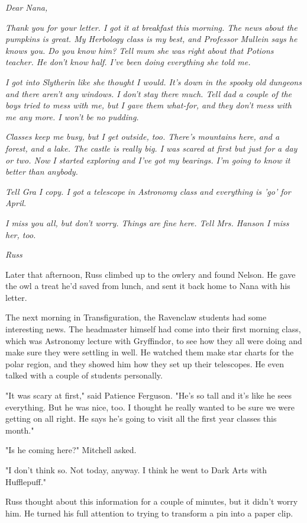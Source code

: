 \documentclass[a4paper,11pt]{article}
\begin{document}
\emph{Dear Nana,}

\emph{Thank you for your letter. I got it at breakfast this morning. The news about the pumpkins is great. My Herbology class is my best, and Professor Mullein says he knows you. Do you know him? Tell mum she was right about that Potions teacher. He don't know half. I've been doing everything she told me.}

\emph{I got into Slytherin like she thought I would. It's down in the spooky old dungeons and there aren't any windows. I don't stay there much. Tell dad a couple of the boys tried to mess with me, but I gave them what-for, and they don't mess with me any more. I won't be no pudding.}

\emph{Classes keep me busy, but I get outside, too. There's mountains here, and a forest, and a lake. The castle is really big. I was scared at first but just for a day or two. Now I started exploring and I've got my bearings. I'm going to know it better than anybody.}

\emph{Tell Gra I copy. I got a telescope in Astronomy class and everything is 'go' for April.}

\emph{I miss you all, but don't worry. Things are fine here. Tell Mrs. Hanson I miss her, too.}

\emph{Russ}

Later that afternoon, Russ climbed up to the owlery and found Nelson. He gave the owl a treat he'd saved from lunch, and sent it back home to Nana with his letter.

The next morning in Transfiguration, the Ravenclaw students had some interesting news. The headmaster himself had come into their first morning class, which was Astronomy lecture with Gryffindor, to see how they all were doing and make sure they were settling in well. He watched them make star charts for the polar region, and they showed him how they set up their telescopes. He even talked with a couple of students personally.

"It was scary at first," said Patience Ferguson. "He's so tall and it's like he sees everything. But he was nice, too. I thought he really wanted to be sure we were getting on all right. He says he's going to visit all the first year classes this month."

"Is he coming here?" Mitchell asked.

"I don't think so. Not today, anyway. I think he went to Dark Arts with Hufflepuff."

Russ thought about this information for a couple of minutes, but it didn't worry him. He turned his full attention to trying to transform a pin into a paper clip.
\end{document}
